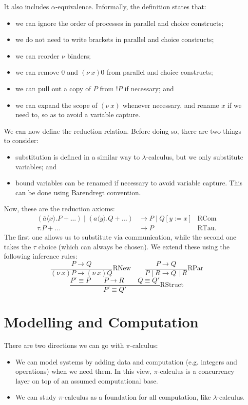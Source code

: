 \documentclass[a4paper, openany]{memoir}
\theoremstyle{definition}
\begin{document}
    It also includes $\alpha$-equivalence. Informally, the definition states that:
    \begin{itemize}
        \item we can ignore the order of processes in parallel and choice constructs;
        \item we do not need to write brackets in parallel and choice constructs;
        \item we can reorder $\nu$ binders;
        \item we can remove $0$ and $(\nu \  x) 0$ from parallel and choice constructs;
        \item we can pull out a copy of $P$ from $!P$ if necessary; and
        \item we can expand the scope of $(\nu \ x)$ whenever necessary, and rename $x$ if we need to, so as to avoid a variable capture.
    \end{itemize}

    We can now define the reduction relation. Before doing so, there are two things to consider:
    \begin{itemize}
        \item substitution is defined in a similar way to $\lambda$-calculus, but we only substitute variables; and
        \item bound variables can be renamed if necessary to avoid variable capture. This can be done using Barendregt convention.
    \end{itemize}
    Now, these are the reduction axioms:
    \begin{align*}
        (\overline{a} \langle x \rangle.P + \dots) \mid (a \langle y \rangle.Q + \dots) &\to P \mid Q[ y:= x] & \textrm{RCom} \\
        \tau.P + \dots &\to P & \textrm{RTau}.
    \end{align*}
    The first one allows us to substitute via communication, while the second one takes the $\tau$ choice (which can always be chosen). We extend these using the following inference rules:
    \[\frac{P \to Q}{(\nu \ x)P \to (\nu \ x)Q} \textrm{RNew} \qquad \frac{P \to Q}{P \mid R \to Q \mid R} \textrm{RPar}\]
    \[\frac{P' \equiv P \qquad P \to R \qquad Q \equiv Q'}{P' \equiv Q'} \textrm{RStruct}\]
    \newpage

    \section{Modelling and Computation}
    There are two directions we can go with $\pi$-calculus:
    \begin{itemize}
        \item We can model systems by adding data and computation (e.g. integers and operations) when we need them. In this view, $\pi$-calculus is a concurrency layer on top of an assumed computational base.
        \item We can study $\pi$-calculus as a foundation for all computation, like $\lambda$-calculus.
    \end{itemize}
    
\end{document}

